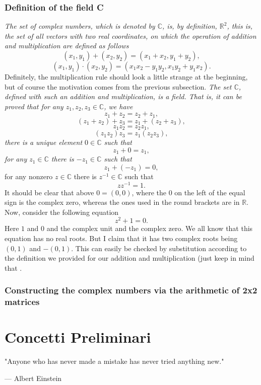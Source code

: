 \documentclass[12pt,oneside,openany]{memoir}
\numberwithin{equation}{subsection}
\begin{document}
\subsection{Definition of the field C}
\textit{The set of complex numbers, which is denoted by $\mathbb{C}$, is, by definition, $\mathbb{R}^2$, this is, the set of all vectors with two real coordinates, on which the operation of addition and multiplication are defined as follows}
\[
	(x_1, y_1) + (x_2, y_2) = (x_1 + x_2, y_1 + y_2),
\]
\[
	(x_1, y_1) \cdot (x_2, y_2) = (x_1 x_2 - y_1 y_2, x_1 y_2 + y_1 x_2).
\]
Definitely, the multiplication rule should look a little strange at the beginning, but of course the motivation comes from the previous subsection.
\bigbreak\noindent
\textit{The set $\mathbb{C}$, defined with such an addition and multiplication, is a field. That is, it can be proved that for any $z_1, z_2, z_3 \in \mathbb{C}$, we have}
\[
	z_1 + z_2 = z_2 + z_1,
\]
\[
	(z_1 + z_2) + z_3 = z_1 + (z_2 + z_3),
\]
\[
	z_1 z_2 = z_2 z_1,
\]
\[
	(z_1 z_2) z_3 = z_1 (z_2 z_3),
\]
\textit{there is a unique element $0 \in \mathbb{C}$ such that}
\[
	z_1 + 0 = z_1,
\]
\textit{for any $z_1 \in \mathbb{C}$ there is $-z_1 \in \mathbb{C}$ such that}
\[
	z_1 + (-z_1) = 0,
\]
for any nonzero $z \in \mathbb{C}$ there is $z^{-1} \in \mathbb{C}$ such that
\[
	z z^{-1} = 1.
\]
It should be clear that above $0 = (0, 0)$, where the $0$ on the left of the equal sign is the complex zero, whereas the ones used in the round brackets are in $\mathbb{R}$.
\bigbreak
Now, consider the following equation
\[
	z^2 + 1 = 0.
\]
Here $1$ and $0$ and the complex unit and the complex zero. We all know  that this equation has  no real roots. But I claim that it has two complex roots being $(0, 1)$ and $-(0, 1)$. This can easily be checked by substitution according to the definition we provided for our addition and multiplication (just keep in mind that .

\subsection{Constructing the complex numbers via the arithmetic of 2x2 matrices}


\chapter{Concetti Preliminari}
\epigraph{"Anyone who has never made a mistake has never tried anything new."}{--- \textup{Albert Einstein}}
\end{document}
